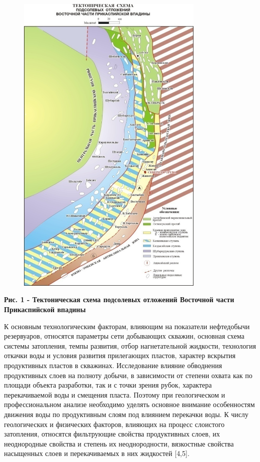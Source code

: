 \begin{figure}[H]
	\centering
	\includegraphics[width=0.8\textwidth]{assets/301}
	\caption*{}
\end{figure}

{\bfseries Рис. 1 - Тектоническая схема подсолевых отложений Восточной
части Прикаспийской впадины}

К основным технологическим факторам, влияющим на показатели нефтедобычи
резервуаров, относятся параметры сети добывающих скважин, основная схема
системы затопления, темпы развития, отбор нагнетательной жидкости,
технология откачки воды и условия развития прилегающих пластов, характер
вскрытия продуктивных пластов в скважинах. Исследование влияние
обводнения продуктивных слоев на полноту добычи, в зависимости от
степени охвата как по площади объекта разработки, так и с точки зрения
рубок, характера перекачиваемой воды и смещения пласта. Поэтому при
геологическом и профессиональном анализе необходимо уделять основное
внимание особенностям движения воды по продуктивным слоям под влиянием
перекачки воды. К числу геологических и физических факторов, влияющих на
процесс слоистого затопления, относятся фильтрующие свойства
продуктивных слоев, их неоднородные свойства и степень их
неоднородности, вязкостные свойства насыщенных слоев и перекачиваемых в
них жидкостей {[}4,5{]}.

